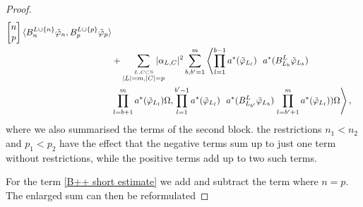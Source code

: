\documentclass[b5paper,draft,openbib,12pt]{memoir}
\begin{document}
\begin{proof}
\begin{align}
\left[\begin{matrix}n\\p\end{matrix}\right] \langle B^{L\cup\{n\}}_{n} \tilde{\varphi}_{n}, B^{L\cup\{p\}}_{p}\tilde{\varphi}_{p}\rangle\label{B++ short estimate}\\
  &+\sum_{\overset{L,C\subset \mathbb{N}}{|L|=m,|C|=p}}\hspace{-0.4cm} |\alpha_{L,C}|^2
   \sum_{b,b'=1}^m 
  \left\langle \prod_{l=1}^{b-1} a^*(\tilde{\varphi}_{L_l})  ~~ a^*(B^{L}_{L_b} \tilde{\varphi}_{L_b})\right.  \label{B++ m squared term}\\\nonumber
  &\prod_{l=b+1}^m a^*(\tilde{\varphi}_{L_l}) \Omega, 
  \prod_{l=1}^{b'-1} a^*(\tilde{\varphi}_{L_l})  ~~ a^*(B_{L_{b'}}^{L} \tilde{\varphi}_{L_b})  \left.\prod_{l=b'+1}^m a^*(\tilde{\varphi}_{L_l}) ) \Omega\right\rangle,
\end{align}
where we also summarised the terms of the second block. the restrictions \(n_1<n_2\)
and \(p_1<p_2\) have the effect that the negative terms sum up to just one term
without restrictions, while the positive terms add up to two such terms. 



For the term \eqref{B++ short estimate} we add and subtract the 
term where \(n=p\). The enlarged sum can then be reformulated


\end{proof}
\end{document}
